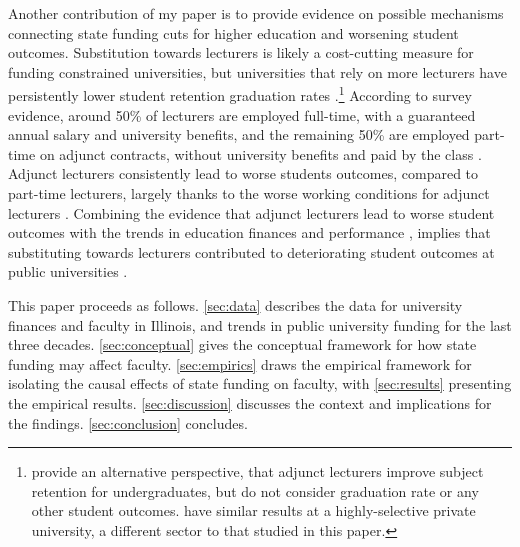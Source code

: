 Another contribution of my paper is to provide evidence on possible mechanisms connecting state funding cuts for higher education and worsening student outcomes.
Substitution towards lecturers is likely a cost-cutting measure for funding constrained universities, but universities that rely on more lecturers have persistently lower student retention graduation rates \citep{jaeger2011examining,ehrenberg2005tenured}.\footnote{
    \cite{bettinger2010does} provide an alternative perspective, that adjunct lecturers improve subject retention for undergraduates, but do not consider graduation rate or any other student outcomes.
    \cite{figlio2015tenure} have similar results at a highly-selective private university, a different sector to that studied in this paper.
}
According to survey evidence, around 50\% of lecturers are employed full-time, with a guaranteed annual salary and university benefits, and the remaining 50\% are employed part-time on adjunct contracts, without university benefits and paid by the class \citep{aau2014Characteristics}.
Adjunct lecturers consistently lead to worse students outcomes, compared to part-time lecturers, largely thanks to the worse working conditions for adjunct lecturers \citep{zhu2021limited}.
Combining the evidence that adjunct lecturers lead to worse student outcomes with the trends in education finances and performance \citep{NBERw23736,NBERw27885}, implies that substituting towards lecturers contributed to deteriorating student outcomes at public universities \citep{NBERw23736,NBERw27885}.

This paper proceeds as follows.
\autoref{sec:data} describes the data for university finances and faculty in Illinois, and trends in public university funding for the last three decades.
\autoref{sec:conceptual} gives the conceptual framework for how state funding may affect faculty.
\autoref{sec:empirics} draws the empirical framework for isolating the causal effects of state funding on faculty, with \autoref{sec:results} presenting the empirical results.
\autoref{sec:discussion} discusses the context and implications for the findings.
\autoref{sec:conclusion} concludes.

